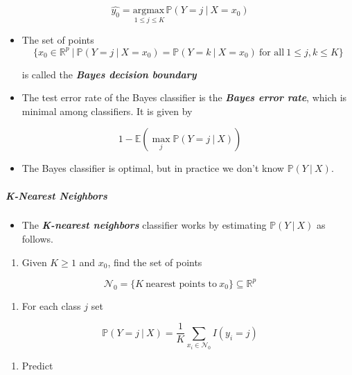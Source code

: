 \documentclass[11pt]{article}
\providecommand{\tightlist}{%
      \setlength{\itemsep}{0pt}\setlength{\parskip}{0pt}}
\begin{document}
\[ \hat{y_0} = \underset{1\leqslant j \leqslant K}{\text{argmax}\,} \mathbb{P}\left(Y=j\ |\ X = x_0\right)\]

\begin{itemize}
\item
  The set of points
  \[\{x_0\in\mathbb{R}^p\ |\ \mathbb{P}\left(Y=j\ |\ X = x_0\right) = \mathbb{P}\left(Y=k\ |\ X = x_0\right)\ \text{for all}\ 1\leqslant j,k \leqslant K\}\]

  is called the \textbf{\emph{Bayes decision boundary}}
\item
  The test error rate of the Bayes classifier is the \textbf{\emph{Bayes
  error rate}}, which is minimal among classifiers. It is given by
\end{itemize}

\[ 1 - \mathbb{E}\left(\underset{j}{\max} \mathbb{P}\left(Y=j\ |\ X\right)\right)\]

\begin{itemize}
\tightlist
\item
  The Bayes classifier is optimal, but in practice we don't know
  \(\mathbb{P}\left(Y\ |\ X\right)\).
\end{itemize}

    \hypertarget{k-nearest-neighbors}{%
\subparagraph{K-Nearest Neighbors}\label{k-nearest-neighbors}}

    \begin{itemize}
\tightlist
\item
  The \textbf{\emph{K-nearest neighbors}} classifier works by estimating
  \(\mathbb{P}\left(Y\ |\ X\right)\) as follows.
\end{itemize}

\begin{enumerate}
\def\labelenumi{\arabic{enumi}.}
\tightlist
\item
  Given \(K\geqslant 1\) and \(x_0\), find the set of points
\end{enumerate}

\[ \mathcal{N}_0 = \{K\ \text{nearest points to}\ x_0\}\subseteq\mathbb{R}^p \]

\begin{enumerate}
\def\labelenumi{\arabic{enumi}.}
\setcounter{enumi}{1}
\tightlist
\item
  For each class \(j\) set
\end{enumerate}

\[ \mathbb{P}\left(Y=j\ |\ X\right) = \frac{1}{K}\sum_{x_i\in\mathcal{N}_0}I(y_i = j)\]

\begin{enumerate}
\def\labelenumi{\arabic{enumi}.}
\setcounter{enumi}{2}
\tightlist
\item
  Predict
\end{enumerate}
\end{document}

